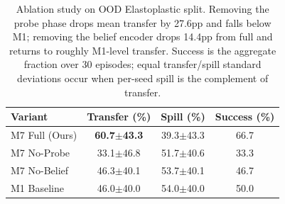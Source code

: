 \begin{table}[t]
\centering
\caption{Ablation study on OOD Elastoplastic split. Removing the probe phase drops mean transfer by 27.6pp and falls below M1; removing the belief encoder drops 14.4pp from full \PTA{} and returns to roughly M1-level transfer. Success is the aggregate fraction over 30 episodes; equal transfer/spill standard deviations occur when per-seed spill is the complement of transfer.}
\label{tab:ablation}
\begin{tabular}{lccc}
\toprule
Variant & Transfer (\%) & Spill (\%) & Success (\%) \\
\midrule
M7 Full (Ours) & \textbf{60.7$\pm$43.3} & 39.3$\pm$43.3 & 66.7 \\
M7 No-Probe & 33.1$\pm$46.8 & 51.7$\pm$40.6 & 33.3 \\
M7 No-Belief & 46.3$\pm$40.1 & 53.7$\pm$40.1 & 46.7 \\
M1 Baseline & 46.0$\pm$40.0 & 54.0$\pm$40.0 & 50.0 \\
\bottomrule
\end{tabular}
\end{table}
